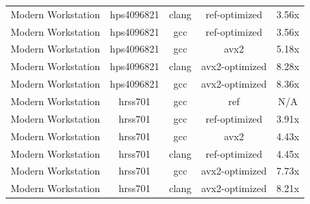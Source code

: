 \begin{table}
\begin{tabularx}{\linewidth}{X c c c c}
          Modern Workstation &           hps4096821 &                clang &        ref-optimized &                3.56x\\
          Modern Workstation &           hps4096821 &                  gcc &        ref-optimized &                3.56x\\
          Modern Workstation &           hps4096821 &                  gcc &                 avx2 &                5.18x\\
          Modern Workstation &           hps4096821 &                clang &       avx2-optimized &                8.28x\\
          Modern Workstation &           hps4096821 &                  gcc &       avx2-optimized &                8.36x\\
          Modern Workstation &              hrss701 &                  gcc &                  ref &                  N/A\\
          Modern Workstation &              hrss701 &                  gcc &        ref-optimized &                3.91x\\
          Modern Workstation &              hrss701 &                  gcc &                 avx2 &                4.43x\\
          Modern Workstation &              hrss701 &                clang &        ref-optimized &                4.45x\\
          Modern Workstation &              hrss701 &                  gcc &       avx2-optimized &                7.73x\\
          Modern Workstation &              hrss701 &                clang &       avx2-optimized &                8.21x\\
        \bottomrule
    \end{tabularx}
\end{table}

